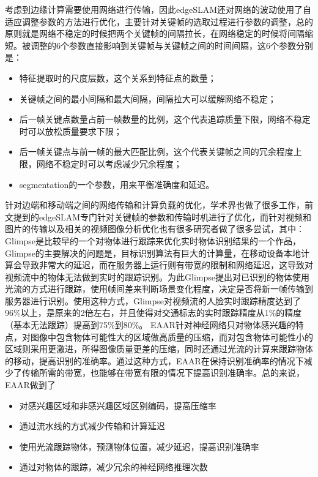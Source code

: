 考虑到边缘计算需要使用网络进行传输，因此edgeSLAM还对网络的波动使用了自适应调整参数的方法进行优化，主要针对关键帧的选取过程进行参数的调整，总的原则就是网络不稳定的时候把两个关键帧的间隔拉长，在网络稳定的时候将间隔缩短。被调整的6个参数直接影响到关键帧与关键帧之间的时间间隔，这6个参数分别是：
\begin{itemize}
  \item 特征提取时的尺度层数，这个关系到特征点的数量；
  \item 关键帧之间的最小间隔和最大间隔，间隔拉大可以缓解网络不稳定；
  \item 后一帧关键点数量占前一帧数量的比例，这个代表追踪质量下限，网络不稳定时可以放松质量要求下限；
  \item 后一帧关键点与前一帧的最大匹配比例，这个代表关键帧之间的冗余程度上限，网络不稳定时可以考虑减少冗余程度；
  \item segmentation的一个参数，用来平衡准确度和延迟。
\end{itemize}

针对边端和移动端之间的网络传输和计算负载的优化，学术界也做了很多工作，前文提到的edgeSLAM专门针对关键帧的参数和传输时机进行了优化，而针对视频和图片的传输以及相关的视频图像分析优化也有很多研究者做了很多尝试，其中：
Glimpse\cite{CheRavDen15}是比较早的一个对物体进行跟踪来优化实时物体识别结果的一个作品，Glimpse的主要解决的问题是，目标识别算法有巨大的计算量，在移动设备本地计算会导致非常大的延迟，而在服务器上运行则有带宽的限制和网络延迟，这导致对视频流中的物体无法做到实时的跟踪识别。为此Glimpse提出对已识别的物体使用光流的方式进行跟踪，使用帧间差来判断场景变化程度，决定是否将新一帧传输到服务器进行识别。使用这种方式，Glimpse对视频流的人脸实时跟踪精度达到了96\%以上，是原来的2倍左右，并且使得对交通标志的实时跟踪精度从1\%的精度（基本无法跟踪）提高到75\%到80\%。
EAAR\cite{DuPerYua20}针对神经网络只对物体感兴趣的特点，对图像中包含物体可能性大的区域做高质量的压缩，而对包含物体可能性小的区域则采用更激进，所得图像质量更差的压缩，同时还通过光流的计算来跟踪物体的移动，提高识别的准确率。通过这种方式，EAAR在保持识别准确率的情况下减少了传输所需的带宽，也能够在带宽有限的情况下提高识别准确率。总的来说，EAAR做到了
\begin{itemize}
  \item 对感兴趣区域和非感兴趣区域区别编码，提高压缩率
  \item 通过流水线的方式减少传输和计算延迟
  \item 使用光流跟踪物体，预测物体位置，减少延迟，提高识别准确率
  \item 通过对物体的跟踪，减少冗余的神经网络推理次数
\end{itemize}


